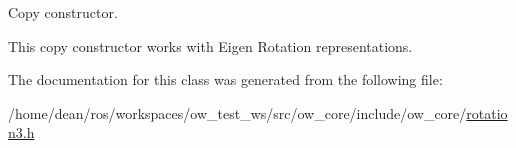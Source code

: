 Copy constructor. 

This copy constructor works with Eigen Rotation representations. 

The documentation for this class was generated from the following file\+:\begin{DoxyCompactItemize}
\item 
/home/dean/ros/workspaces/ow\+\_\+test\+\_\+ws/src/ow\+\_\+core/include/ow\+\_\+core/\hyperlink{rotation3_8h}{rotation3.\+h}\end{DoxyCompactItemize}
